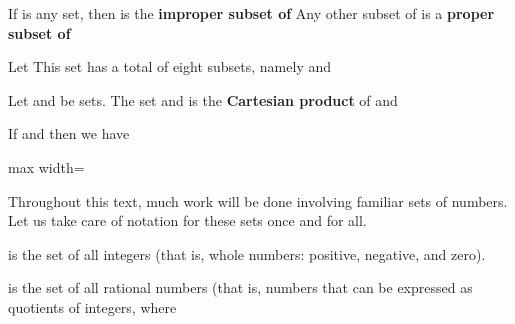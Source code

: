 \documentclass[11pt,oneside]{article}
\begin{document}
\begin{BookBody}
 If  is any set, then  is the\textbf{ improper subset of}  Any other subset of  is a\textbf{ proper} \textbf{subset of} \BookEnd{\blacksquare}

 Let  This set  has a total of eight subsets, namely   and \BookEnd{\blacktriangle}

 Let  and  be sets. The set  and  is the\textbf{ Cartesian product} of  and \BookEnd{\blacksquare}

 If  and  then we have

\begin{center}\begin{adjustbox}{max width=\linewidth}\end{adjustbox}\end{center} \BookEnd{\blacktriangle}

Throughout this text, much work will be done involving familiar sets of numbers. Let us take care of notation for these sets once and for all.

 is the set of all integers (that is, whole numbers: positive, negative, and zero).

 is the set of all rational numbers (that is, numbers that can be expressed as quotients  of integers, where 

\end{BookBody}

\BookNarrativetrue
\end{document}
